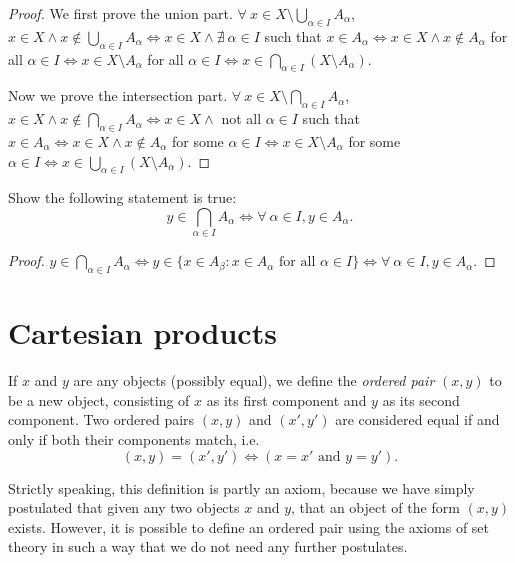 \begin{proof}
We first prove the union part.
\(\forall\ x \in X \setminus \bigcup_{\alpha \in I} A_{\alpha}\), \(x \in X \land x \notin \bigcup_{\alpha \in I} A_{\alpha} \iff x \in X \land \nexists\ \alpha \in I\) such that \(x \in A_{\alpha} \iff x \in X \land x \notin A_{\alpha}\) for all \(\alpha \in I \iff x \in X \setminus A_{\alpha}\) for all \(\alpha \in I \iff x \in \bigcap_{\alpha \in I} (X \setminus A_{\alpha})\).

Now we prove the intersection part.
\(\forall\ x \in X \setminus \bigcap_{\alpha \in I} A_{\alpha}\), \(x \in X \land x \notin \bigcap_{\alpha \in I} A_{\alpha} \iff x \in X \land\) not all \(\alpha \in I\) such that \(x \in A_{\alpha} \iff x \in X \land x \notin A_{\alpha}\) for some \(\alpha \in I \iff x \in X \setminus A_{\alpha}\) for some \(\alpha \in I \iff x \in \bigcup_{\alpha \in I} (X \setminus A_{\alpha})\).
\end{proof}

\begin{exercise}\label{ex 3.4.12}
Show the following statement is true:
\[
    y \in \bigcap_{\alpha \in I} A_{\alpha} \iff \forall\ \alpha \in I, y \in A_{\alpha}.
\]
\end{exercise}

\begin{proof}
\(y \in \bigcap_{\alpha \in I} A_{\alpha} \iff y \in \{x \in A_{\beta} : x \in A_{\alpha} \text{ for all } \alpha \in I\} \iff \forall\ \alpha \in I, y \in A_{\alpha}\).
\end{proof}

\section{Cartesian products}

\begin{definition}\label{3.5.1}
If \(x\) and \(y\) are any objects (possibly equal), we define the \emph{ordered pair} \((x, y)\) to be a new object, consisting of \(x\) as its first component and \(y\) as its second component.
Two ordered pairs \((x, y)\) and \((x', y')\) are considered equal if and only if both their components match, i.e.
\[
    (x, y) = (x', y') \iff (x = x' \text{ and } y = y').
\]
\end{definition}

\begin{remark}\label{3.5.2}
Strictly speaking, this definition is partly an axiom, because we have simply postulated that given any two objects \(x\) and \(y\), that an object of the form \((x, y)\) exists.
However, it is possible to define an ordered pair using the axioms of set theory in such a way that we do not need any further postulates.
\end{remark}

